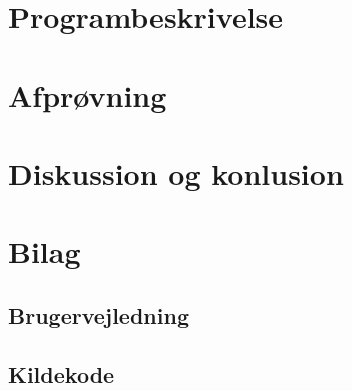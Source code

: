 \documentclass[a4paper]{article}
\begin{document}
  \section{Programbeskrivelse}

  \section{Afprøvning} \label{sec:unitTest}

	\section{Diskussion og konlusion}
  
    \newpage
    \section{Bilag}
    
    \subsection{Brugervejledning}

    \subsection{Kildekode}
      
      
      
\end{document}
